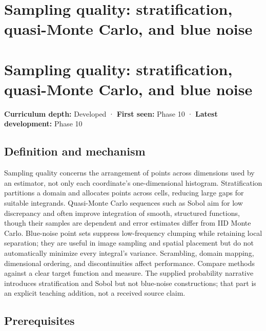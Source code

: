\hypertarget{appendix-9f693ffd82bc}{}
\section*{Sampling quality: stratification, quasi-Monte Carlo, and blue noise}
\section{Sampling quality: stratification, quasi-Monte Carlo, and blue noise}\label{appendix-9f693ffd82bc-sampling-quality-stratification-quasi-monte-carlo-and-blue-noise}

\textbf{Curriculum depth:} Developed · \textbf{First seen:} Phase 10 · \textbf{Latest development:} Phase 10

\subsection{Definition and mechanism}\label{appendix-9f693ffd82bc-definition-and-mechanism}

Sampling quality concerns the arrangement of points across dimensions used by an estimator, not only each coordinate's one-dimensional histogram. Stratification partitions a domain and allocates points across cells, reducing large gaps for suitable integrands. Quasi-Monte Carlo sequences such as Sobol aim for low discrepancy and often improve integration of smooth, structured functions, though their samples are dependent and error estimates differ from IID Monte Carlo. Blue-noise point sets suppress low-frequency clumping while retaining local separation; they are useful in image sampling and spatial placement but do not automatically minimize every integral's variance. Scrambling, domain mapping, dimensional ordering, and discontinuities affect performance. Compare methods against a clear target function and measure. The supplied probability narrative introduces stratification and Sobol but not blue-noise constructions; that part is an explicit teaching addition, not a received source claim.

\subsection{Prerequisites}\label{appendix-9f693ffd82bc-prerequisites}

